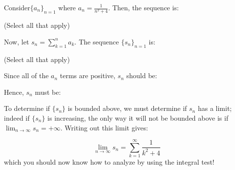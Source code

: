 \documentclass{ximera}
\author{Jim Talamo}
\begin{document}
\begin{exercise}
Consider$\{a_n \}_{n=1}$ where $a_n = \frac{1}{n^2+4}$.  Then, the sequence is:

\begin{selectAll}
\end{selectAll}
(Select all that apply)

Now, let $s_n = \sum_{k=1}^{n} a_k$.  The sequence $\{s_n \}_{n=1}$ is:
\begin{selectAll}
\end{selectAll}
(Select all that apply)

\begin{hint}
Since all of the $a_n$ terms are positive, $s_n$ should be:

\begin{multipleChoice}
\end{multipleChoice}

Hence, $s_n$ must be:
\begin{multipleChoice}
\end{multipleChoice}

To determine if $\{s_n\}$ is bounded above, we must determine if $s_n$ has a limit; indeed if $\{s_n\}$ is increasing, the only way it will not be bounded above is if $\lim_{n \to \infty} s_n = +\infty$.  Writing out this limit gives:

\[
\lim_{n \to \infty} s_n = \sum_{k=1}^{\infty}  \frac{1}{k^2+4}
\]
which you should now know how to analyze by using the integral test!
\end{hint}
\end{exercise}
\end{document}
